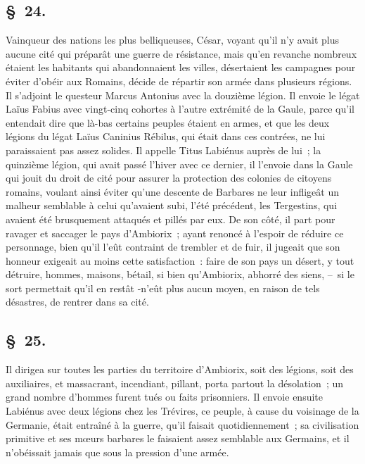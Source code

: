 \documentclass[french,twoside]{book} %
\begin{document}
\subsection[{§ 24.}]{ \textsc{§ 24.} }
\noindent Vainqueur des nations les plus belliqueuses, César, voyant qu’il n’y avait plus aucune cité qui préparât une guerre de résistance, mais qu’en revanche nombreux étaient les habitants qui abandonnaient les villes, désertaient les campagnes pour éviter d’obéir aux Romains, décide de répartir son armée dans plusieurs régions. Il s’adjoint le questeur Marcus Antonius avec la douzième légion. Il envoie le légat Laïus Fabius avec vingt-cinq cohortes à l’autre extrémité de la Gaule, parce qu’il entendait dire que là-bas certains peuples étaient en armes, et que les deux légions du légat Laïus Caninius Rébilus, qui était dans ces contrées, ne lui paraissaient pas assez solides. Il appelle Titus Labiénus auprès de lui ; la quinzième légion, qui avait passé l’hiver avec ce dernier, il l’envoie dans la Gaule qui jouit du droit de cité pour assurer la protection des colonies de citoyens romains, voulant ainsi éviter qu’une descente de Barbares ne leur infligeât un malheur semblable à celui qu’avaient subi, l’été précédent, les Tergestins, qui avaient été brusquement attaqués et pillés par eux. De son côté, il part pour ravager et saccager le pays d’Ambiorix ; ayant renoncé à l’espoir de réduire ce personnage, bien qu’il l’eût contraint de trembler et de fuir, il jugeait que son honneur exigeait au moins cette satisfaction : faire de son pays un désert, y tout détruire, hommes, maisons, bétail, si bien qu’Ambiorix, abhorré des siens, – si le sort permettait qu’il en restât -n’eût plus aucun moyen, en raison de tels désastres, de rentrer dans sa cité.
\subsection[{§ 25.}]{ \textsc{§ 25.} }
\noindent Il dirigea sur toutes les parties du territoire d’Ambiorix, soit des légions, soit des auxiliaires, et massacrant, incendiant, pillant, porta partout la désolation ; un grand nombre d’hommes furent tués ou faits prisonniers. Il envoie ensuite Labiénus avec deux légions chez les Trévires, ce peuple, à cause du voisinage de la Germanie, était entraîné à la guerre, qu’il faisait quotidiennement ; sa civilisation primitive et ses mœurs barbares le faisaient assez semblable aux Germains, et il n’obéissait jamais que sous la pression d’une armée.
\end{document}
